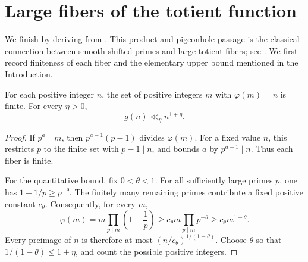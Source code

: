 \section{Large fibers of the totient function}\label{sec:totients}

We finish by deriving  from .
This product-and-pigeonhole passage is the classical connection between
smooth shifted primes and large totient fibers; see
\cite[Theorem~B and its proof]{Pomerance1980}.
We first record finiteness of each fiber and the elementary upper
bound mentioned in the Introduction.

\begin{lemma}\label{lem:finite-totient-fibers}
For each positive integer $n$, the set of positive integers $m$ with
$\varphi(m)=n$ is finite. For every $\eta>0$,
\[
 g(n)\ll_\eta n^{1+\eta}.
\]
\end{lemma}

\begin{proof}
If $p^a\parallel m$, then $p^{a-1}(p-1)$ divides $\varphi(m)$.
For a fixed value $n$, this restricts $p$ to the finite set with
$p-1\mid n$, and bounds $a$ by $p^{a-1}\mid n$. Thus each fiber
is finite.

For the quantitative bound, fix $0<\theta<1$. For all sufficiently
large primes $p$, one has $1-1/p\ge p^{-\theta}$. The finitely many
remaining primes contribute a fixed positive constant $c_\theta$.
Consequently, for every $m$,
\[
 \varphi(m)=m\prod_{p\mid m}\left(1-\frac1p\right)
 \ge c_\theta m\prod_{p\mid m}p^{-\theta}
 \ge c_\theta m^{1-\theta}.
\]
Every preimage of $n$ is therefore at most
$(n/c_\theta)^{1/(1-\theta)}$. Choose $\theta$ so that
$1/(1-\theta)\le1+\eta$, and count the possible positive integers.
\end{proof}

